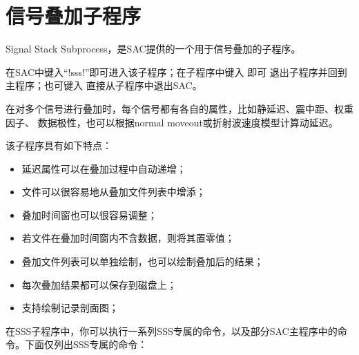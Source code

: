 \section{信号叠加子程序}
Signal Stack Subprocess，是SAC提供的一个用于信号叠加的子程序。

在SAC中键入``!sss!''即可进入该子程序；在子程序中键入  即可
退出子程序并回到主程序；也可键入  直接从子程序中退出SAC。

在对多个信号进行叠加时，每个信号都有各自的属性，比如静延迟、震中距、权重因子、
数据极性，也可以根据normal moveout或折射波速度模型计算动延迟。

该子程序具有如下特点：
\begin{itemize}
\item 延迟属性可以在叠加过程中自动递增；
\item 文件可以很容易地从叠加文件列表中增添；
\item 叠加时间窗也可以很容易调整；
\item 若文件在叠加时间窗内不含数据，则将其置零值；
\item 叠加文件列表可以单独绘制，也可以绘制叠加后的结果；
\item 每次叠加结果都可以保存到磁盘上；
\item 支持绘制记录剖面图；
\end{itemize}

在SSS子程序中，你可以执行一系列SSS专属的命令，以及部分SAC主程序中的命令。下面仅列出SSS专属的命令：

